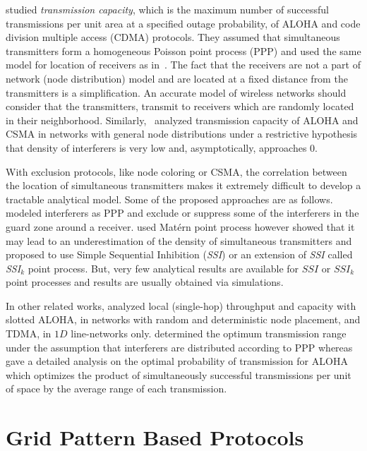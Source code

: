 \documentclass[12pt,english]{article}
\begin{document}
\cite{Weber,Weber2} studied {\em transmission capacity}, which is the maximum number of successful transmissions per unit area at a specified outage probability, of ALOHA and code division multiple access (CDMA) protocols. They assumed that simultaneous transmitters form a homogeneous Poisson point process (PPP) and used the same model for location of receivers as in~\cite{Bartek}. The fact that the receivers are not a part of network (node distribution) model and are located at a fixed distance from the transmitters is a simplification. An accurate model of wireless networks should consider that the transmitters, transmit to receivers which are randomly located in their neighborhood. Similarly,~\cite{Weber3} analyzed transmission capacity of ALOHA and CSMA in networks with general node distributions under a restrictive hypothesis that density of interferers is very low and, asymptotically, approaches $0$. 

With exclusion protocols, like node coloring or CSMA, the correlation between the location of simultaneous transmitters makes it extremely difficult to develop a tractable analytical model. Some of the proposed approaches are as follows. \cite{Guard,Guard2} modeled interferers as PPP and exclude or suppress some of the interferers in the guard zone around a receiver. \cite{CSMA-Model,Weber3} used Mat\'ern point process however \cite{Busson} showed that it may lead to an underestimation of the density of simultaneous transmitters and proposed to use Simple Sequential Inhibition ({\em SSI}) or an extension of {\em SSI} called {\em SSI$_k$} point process. But, very few analytical results are available for $SSI$ or $SSI_k$ point processes and results are usually obtained via simulations.

In other related works, \cite{Haenggi} analyzed local (single-hop) throughput and capacity with slotted ALOHA, in networks with random and deterministic node placement, and TDMA, in $1D$ line-networks only. \cite{Zorzi2} determined the optimum transmission range under the assumption that interferers are distributed according to PPP whereas \cite{SR-ALOHA} gave a detailed analysis on the optimal probability of transmission for ALOHA which optimizes the product of simultaneously successful transmissions per unit of space by the average range of each transmission. 

 
\section{Grid Pattern Based Protocols}
\label{sec:grid_pattern}
\end{document}
